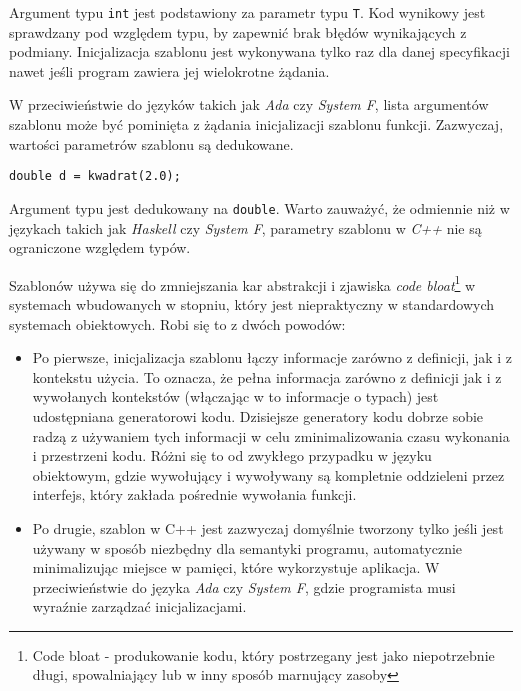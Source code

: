 \documentclass[11pt, a4paper]{article}
\begin{document}
Argument typu \verb#int# jest podstawiony za parametr typu \verb#T#. Kod wynikowy jest sprawdzany pod względem typu, by zapewnić brak błędów wynikających z podmiany. Inicjalizacja szablonu jest wykonywana tylko raz dla danej specyfikacji nawet jeśli program zawiera jej wielokrotne żądania. 

W przeciwieństwie do języków takich jak \emph{Ada} czy \emph{System F}, lista argumentów szablonu może być pominięta z żądania inicjalizacji szablonu funkcji. Zazwyczaj, wartości parametrów szablonu są dedukowane.
\newline

\verb#double d = kwadrat(2.0);# \newline

Argument typu jest dedukowany na \verb#double#. Warto zauważyć, że odmiennie niż w językach takich jak \emph{Haskell} czy \emph{System F}, parametry szablonu w \emph{C++} nie są ograniczone względem typów.

Szablonów używa się do zmniejszania kar abstrakcji i zjawiska \emph{code bloat}\footnote{Code bloat - produkowanie kodu, który postrzegany jest jako niepotrzebnie długi, spowalniający lub w inny sposób marnujący zasoby} w systemach wbudowanych w stopniu, który jest niepraktyczny w standardowych systemach obiektowych. Robi się to z dwóch powodów:

\begin{itemize}

\item Po pierwsze, inicjalizacja szablonu łączy informacje zarówno z definicji, jak i z kontekstu użycia. To oznacza, że pełna informacja zarówno z definicji jak i z wywołanych kontekstów (włączając w to informacje o typach) jest udostępniana generatorowi kodu. Dzisiejsze generatory kodu dobrze sobie radzą z używaniem tych informacji w celu zminimalizowania czasu wykonania i przestrzeni kodu. Różni się to od zwykłego przypadku w języku obiektowym, gdzie wywołujący i wywoływany są kompletnie oddzieleni przez interfejs, który zakłada pośrednie wywołania funkcji.

\item Po drugie, szablon w C++ jest zazwyczaj domyślnie tworzony tylko jeśli jest używany w sposób niezbędny dla semantyki programu, automatycznie minimalizując miejsce w pamięci, które wykorzystuje aplikacja. W przeciwieństwie do języka \emph{Ada} czy \emph{System F}, gdzie programista musi wyraźnie zarządzać inicjalizacjami.

\end{itemize}
\end{document}
